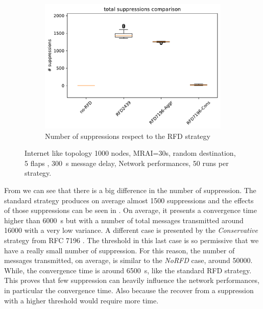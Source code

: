 \begin{figure}[h]
\begin{subfigure}[b]{0.49\textwidth}
     \end{subfigure}
     \begin{subfigure}[b]{0.49\textwidth}
         \centering
         \includegraphics[width=\textwidth]{images/RFD/miceVSelephants/mice/cisco_1000MRAI30_rfd_comparison_suppressions_boxplot.pdf}
         \caption{Number of suppressions respect to the RFD strategy}
         \label{fig:1000_RFD_MRAI30_mice_suppressions_bis}
     \end{subfigure}
		\caption{Internet like topology 1000 nodes, MRAI=30s, random destination,
		5 flaps , \SI{300}{\second} message delay, Network performances,
		\num{50} runs per strategy.}
        \label{fig:1000_RFD_MRAI30_mice_bis}
\end{figure}

From  we can see that there is a
big difference in the number of suppression.
The standard strategy produces on average almost \num{1500} suppressions and the effects
of those suppressions can be seen in .
On average, it presents a convergence time higher than \SI{6000}{\second}
but with a number of total messages transmitted around \num{16000} with a very
low variance.
A different case is presented by the \textit{Conservative} strategy from \ac{RFC}
7196 \cite{rfc7196}.
The threshold in this last case is so permissive that we have a really small
number of suppression.
For this reason, the number of messages transmitted, on average, is similar to
the \textit{NoRFD} case, around \num{50000}.
While, the convergence time is around \SI{6500}{\second}, like the standard \ac{RFD}
strategy.
This proves that few suppression can heavily influence the network performances,
in particular the convergence time.
Also because the recover from a suppression with a higher threshold would require
more time.

